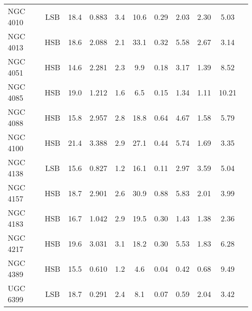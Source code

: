 \documentclass[preprint,aps]{revtex4}
\begin{document}
\begin{table}
\begin{tabular}{l c c c c c c c c c c}
\\
NGC 4010 &LSB& 18.4 &  0.883    & 3.4 &  10.6 & 0.29 &\phantom{0}2.03 & 2.30 &
\phantom{0}5.03 &     \cite{Verheijen2001} \cite{Sanders1998} \cite{Tully1997a} \cite{Sanders1998} 
 \\
NGC 4013&HSB & 18.6 &  2.088    & 2.1 & 33.1 & 0.32 & \phantom{0}5.58 & 2.67
&\phantom{0}3.14 &   \cite{Verheijen2001} \cite{Sanders1998} \cite{Tully1997a} \cite{Sanders1998}    
\\
NGC 4051 &HSB& 14.6 &   2.281   & 2.3 &  \phantom{0}9.9& 0.18 & \phantom{0}3.17 & 1.39 &
\phantom{0}8.52 &     \cite{Verheijen2001} \cite{Sanders1998} \cite{Tully1997b} \cite{Sanders1998} 
 \\
NGC 4085&HSB& 19.0 &   1.212   &1.6 & \phantom{0}6.5 & 0.15 & \phantom{0}1.34 &1.11 &
10.21 &    \cite{Verheijen2001} \cite{Sanders1998} \cite{Tully1997a} \cite{Sanders1998}   
\\
NGC 4088&HSB & 15.8 &   2.957  & 2.8 & 18.8 & 0.64 &\phantom{0}4.67 & 1.58 &
\phantom{0}5.79&   \cite{Verheijen2001} \cite{Sanders1998} \cite{Tully1997a} \cite{Sanders1998}    \\
NGC 4100&HSB & 21.4 &  3.388   & 2.9 & 27.1 & 0.44 & \phantom{0}5.74 & 1.69 &
\phantom{0}3.35 &   \cite{Verheijen2001} \cite{Sanders1998} \cite{Tully1997a} \cite{Sanders1998}    \\
NGC 4138 &LSB&15.6 &   0.827   & 1.2 & 16.1 & 0.11 & \phantom{0}2.97 & 3.59 &
\phantom{0}5.04 &   \cite{Verheijen2001} \cite{Sanders1998} \cite{Tully1997a} \cite{Sanders1998}    \\
NGC 4157&HSB & 18.7 &   2.901   & 2.6 & 30.9 & 0.88 & \phantom{0}5.83 & 2.01 &
\phantom{0}3.99 &   \cite{Verheijen2001} \cite{Sanders1998} \cite{Tully1997a} \cite{Sanders1998}    \\
NGC 4183 &HSB& 16.7 &    1.042 & 2.9 & 19.5 & 0.30 &\phantom{0}1.43 & 1.38 &
\phantom{0}2.36 &    \cite{Verheijen2001} \cite{Sanders1998} \cite{Tully1997a} \cite{Sanders1998}   \\
NGC 4217&HSB & 19.6 &   3.031   & 3.1 & 18.2 & 0.30 & \phantom{0}5.53 &1.83 &
\phantom{0}6.28 &   \cite{Verheijen2001} \cite{Sanders1998} \cite{Tully1997a} \cite{Sanders1998}    \\
NGC 4389&HSB& 15.5 &   0.610   & 1.2 & \phantom{0}4.6 &0.04 & \phantom{0}0.42 & 0.68 &
\phantom{0}9.49 &    \cite{Verheijen2001} \cite{Sanders1998} \cite{Tully1997a} \cite{Sanders1998}   
\\
UGC 6399&LSB& 18.7 &   0.291  & 2.4 & \phantom{0}8.1 &0.07 & \phantom{0}0.59 &2.04 &
\phantom{0}3.42&    \cite{Verheijen2001} \cite{Sanders1998} \cite{Tully1997a} \cite{Sanders1998}   \\

\end{tabular}
\end{table}
\end{document}

